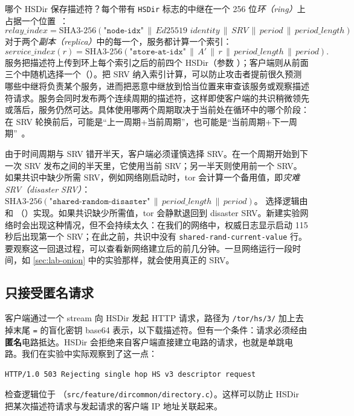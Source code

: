 哪个 HSDir 保存描述符？每个带有 \texttt{HSDir} 标志的中继在一个 256 位\emph{环（ring）}上占据一个位置~：
\[
\mathit{relay\_index} = \mathrm{SHA3\text{-}256}(\texttt{"node-idx"} \,\|\, \textit{Ed25519 identity} \,\|\, \mathit{SRV} \,\|\, \mathit{period} \,\|\, \mathit{period\_length})
\]
对于两个\emph{副本（replica）}中的每一个，服务都计算一个索引：
\[
\mathit{service\_index}(r) = \mathrm{SHA3\text{-}256}(\texttt{"store-at-idx"} \,\|\, A' \,\|\, r \,\|\, \mathit{period\_length} \,\|\, \mathit{period}).
\]
服务把描述符上传到环上每个索引之后的前四个 HSDir（参数 ）；客户端则从前面三个中随机选择一个（）。把 SRV 纳入索引计算，可以防止攻击者提前很久预测哪些中继将负责某个服务，进而把恶意中继放到恰当位置来审查该服务或观察描述符请求。服务会同时发布两个连续周期的描述符，这样即使客户端的共识稍微领先或落后，服务仍然可达。具体使用哪两个周期取决于当前处在循环中的哪个阶段：在 SRV 轮换前后，可能是“上一周期+当前周期”，也可能是“当前周期+下一周期”~。

\begin{approfondimento}
由于时间周期与 SRV 错开半天，客户端必须谨慎选择 SRV。在一个周期开始到下一次 SRV 发布之间的半天里，它使用当前 SRV；另一半天则使用前一个 SRV。如果共识中缺少所需 SRV，例如网络刚启动时，tor 会计算一个备用值，即\emph{灾难 SRV（disaster SRV）}：
$\mathrm{SHA3\text{-}256}(\texttt{"shared-random-disaster"} \,\|\, \mathit{period\_length} \,\|\, \mathit{period})$。
选择逻辑由  和 （）实现。如果共识缺少所需值，tor 会静默退回到 disaster SRV。新建实验网络时会出现这种情况，但不会持续太久：在我们的网络中，权威日志显示启动 115 秒后出现第一个 SRV；在此之前，共识中没有 \texttt{shared-rand-current-value} 行。要观察这一回退过程，可以查看新网络建立后的前几分钟。一旦网络运行一段时间，如 \cref{sec:lab-onion} 中的实验那样，就会使用真正的 SRV。
\end{approfondimento}

\subsection{只接受匿名请求}

客户端通过一个  stream 向 HSDir 发起 HTTP 请求，路径为 \nolinkurl{/tor/hs/3/} 加上去掉末尾 \texttt{=} 的盲化密钥 base64 表示，以下载描述符。但有一个条件：请求必须经由\textbf{匿名}电路抵达。HSDir 会拒绝来自客户端直接建立电路的请求，也就是单跳电路。我们在实验中实际观察到了这一点：
\begin{lstlisting}[numbers=none]
HTTP/1.0 503 Rejecting single hop HS v3 descriptor request
\end{lstlisting}
检查逻辑位于 （\nolinkurl{src/feature/dircommon/directory.c}）。这样可以防止 HSDir 把某次描述符请求与发起请求的客户端 IP 地址关联起来。

